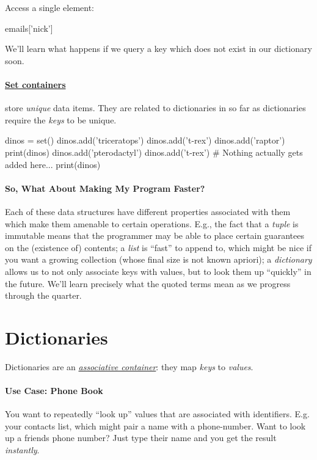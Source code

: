 \documentclass[12pt,letterpaper,twoside]{article}
\begin{document}
Access a single element:
\begin{python}
emails['nick']
\end{python}
We'll learn what happens if we query a key which does not exist in our dictionary soon.

\paragraph{\href{https://en.wikipedia.org/wiki/Set_(abstract_data_type)}{Set containers}} 
store \emph{unique} data items. They are related to
dictionaries in so far as dictionaries require the \emph{keys} to be unique.

\begin{python}
dinos = set()
dinos.add('triceratops')
dinos.add('t-rex')
dinos.add('raptor')
print(dinos)
dinos.add('pterodactyl')
dinos.add('t-rex')         # Nothing actually gets added here...
print(dinos)
\end{python}

\paragraph{So, What About Making My Program Faster?} Each of these data structures
have different properties associated with them which make them amenable to certain
operations. E.g., the fact that a \emph{tuple} is immutable means that the programmer
may be able to place certain guarantees on the (existence of) contents; a \emph{list} is
``fast'' to append to, which might be nice if you want a growing collection (whose final size is not known apriori); 
a \emph{dictionary} allows us to not only associate keys with values, but to look them up ``quickly'' in the future.
We'll learn precisely what the quoted terms mean as we progress through the quarter.

\section{Dictionaries}
Dictionaries are an \href{https://en.wikipedia.org/wiki/Collection_(abstract_data_type)#Associative_arrays}{\emph{associative container}}: 
they map \emph{keys} to \emph{values}. 

\vspace{-2ex}
\paragraph{Use Case: Phone Book} You want to repeatedly ``look up'' values that are associated with identifiers. E.g. your contacts list, which might pair
a name with a phone-number. Want to look up a friends phone number? Just type their name and you get the result \emph{instantly}.
\end{document}
